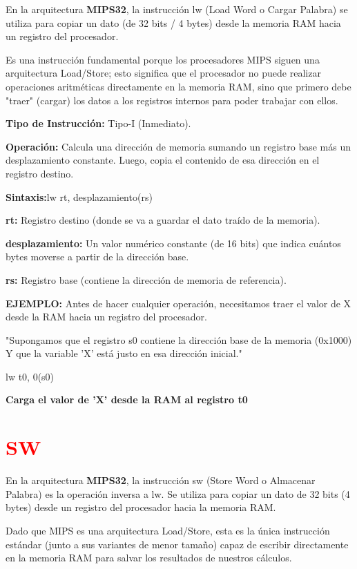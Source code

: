 \documentclass[12pt,a4paper]{article}
\begin{document}
En la arquitectura \textbf{MIPS32}, la instrucción lw (Load Word o Cargar Palabra) se utiliza para copiar un dato (de 32 bits / 4 bytes) desde la memoria RAM hacia un registro del procesador.

Es una instrucción fundamental porque los procesadores MIPS siguen una arquitectura Load/Store; esto significa que el procesador no puede realizar operaciones aritméticas directamente en la memoria RAM, sino que primero debe "traer" (cargar) los datos a los registros internos para poder trabajar con ellos.

\textbf{Tipo de Instrucción:} Tipo-I (Inmediato).

\textbf{Operación:} Calcula una dirección de memoria sumando un registro base más un desplazamiento constante. Luego, copia el contenido de esa dirección en el registro destino.

\textbf{Sintaxis:}lw rt, desplazamiento(rs)

\textbf{rt:} Registro destino (donde se va a guardar el dato traído de la memoria).

\textbf{desplazamiento:} Un valor numérico constante (de 16 bits) que indica cuántos bytes moverse a partir de la dirección base.

\textbf{rs:} Registro base (contiene la dirección de memoria de referencia).

\textbf{EJEMPLO:}
Antes de hacer cualquier operación, necesitamos traer el valor de X desde la RAM hacia un registro del procesador.

"Supongamos que el registro s0 contiene la dirección base de la memoria (0x1000)
Y que la variable 'X' está justo en esa dirección inicial."

lw t0, 0(s0)

\textbf{Carga el valor de 'X' desde la RAM al registro t0}

\section{\textcolor{red}{SW}}

En la arquitectura \textbf{MIPS32}, la instrucción sw (Store Word o Almacenar Palabra) es la operación inversa a lw. Se utiliza para copiar un dato de 32 bits (4 bytes) desde un registro del procesador hacia la memoria RAM.

Dado que MIPS es una arquitectura Load/Store, esta es la única instrucción estándar (junto a sus variantes de menor tamaño) capaz de escribir directamente en la memoria RAM para salvar los resultados de nuestros cálculos.
\end{document}
